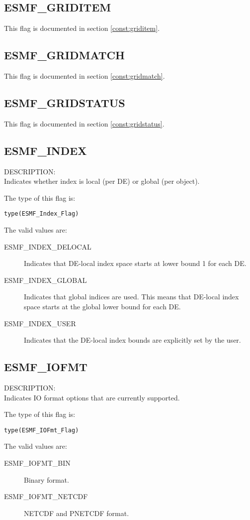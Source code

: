 \subsection{ESMF\_GRIDITEM}
This flag is documented in section \ref{const:griditem}.

\subsection{ESMF\_GRIDMATCH}
This flag is documented in section \ref{const:gridmatch}.

\subsection{ESMF\_GRIDSTATUS}
This flag is documented in section \ref{const:gridstatus}.

\subsection{ESMF\_INDEX}
\label{const:indexflag}
{\sf DESCRIPTION:\\}
Indicates whether index is local (per DE) or global (per object).

The type of this flag is:

{\tt type(ESMF\_Index\_Flag)}

The valid values are:
\begin{description}
\item [ESMF\_INDEX\_DELOCAL]
      Indicates that DE-local index space starts at lower bound 1 for each DE.
\item [ESMF\_INDEX\_GLOBAL]
      Indicates that global indices are used. This means that DE-local index
      space starts at the global lower bound for each DE.
\item [ESMF\_INDEX\_USER]
      Indicates that the DE-local index bounds are explicitly set by the user.
\end{description}

\subsection{ESMF\_IOFMT}
\label{opt:iofmtflag}
{\sf DESCRIPTION:\\}
Indicates IO format options that are currently supported.

The type of this flag is:

{\tt type(ESMF\_IOFmt\_Flag)}

The valid values are:
\begin{description}
\item [ESMF\_IOFMT\_BIN]
      Binary format.
\item [ESMF\_IOFMT\_NETCDF]
      NETCDF and PNETCDF format.
\end{description}

